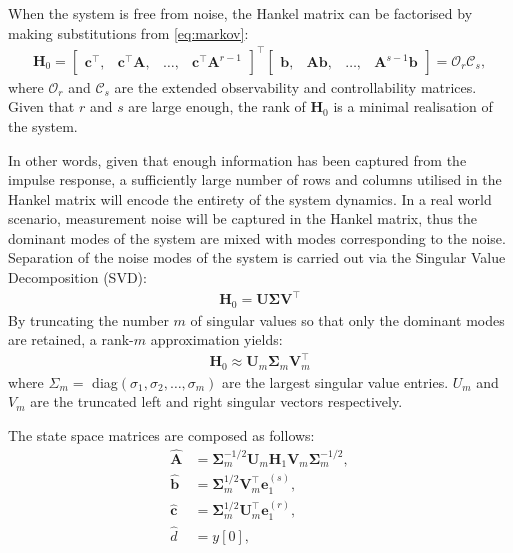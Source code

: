 When the system is free from noise, the Hankel matrix can be factorised by making substitutions from \eqref{eq:markov}:
\begin{align}
\label{eq:factorised}
    \mathbf{H}_0 = 
    \begin{bmatrix}
    \mathbf{c}^{\top}, & \mathbf{c}^{\top} \mathbf{A}, & \dots, & \mathbf{c}^{\top} \mathbf{A}^{r-1}
    \end{bmatrix}^{\top}
    \begin{bmatrix}
    \mathbf{b}, & \mathbf{A} \mathbf{b}, & \dots, & \mathbf{A}^{s-1} \mathbf{b}
    \end{bmatrix}
    = \mathcal{O}_r \mathcal{C}_s,
\end{align}
where $\mathcal{O}_r$ and $\mathcal{C}_s$ are the extended observability and controllability matrices. Given that $r$ and $s$ are large enough, the rank of $\mathbf{H}_0$ is a minimal realisation of the system.

In other words, given that enough information has been captured from the impulse response, a sufficiently large number of rows and columns utilised in the Hankel matrix will encode the entirety of the system dynamics. In a real world scenario, measurement noise will be captured in the Hankel matrix, thus the dominant modes of the system are mixed with modes corresponding to the noise. Separation of the noise modes of the system is carried out via the Singular Value Decomposition (SVD):
\begin{align}
\label{eq:svd}
    \mathbf{H}_0 = \mathbf{U \Sigma V}^\top
\end{align}
By truncating the number $m$ of singular values so that only the dominant modes are retained, a rank-$m$ approximation yields:
\begin{align}
\label{eq:svdm}
    \mathbf{H}_0 \approx \mathbf{U}_m \mathbf{\Sigma}_m \mathbf{V}_{m}^{\top}
\end{align}
where $\Sigma_m =$ diag$(\sigma_1,\sigma_2, \dots, \sigma_m)$ are the largest singular value entries. $U_m$ and $V_m$ are the truncated left and right singular vectors respectively.

The state space matrices are composed as follows:
\begin{align}
\label{eq:ss}
\hat{\mathbf{A}} &= \mathbf{\Sigma}_{m}^{-1/2} \mathbf{U}_m \mathbf{H}_1 \mathbf{V}_m \mathbf{\Sigma}_{m}^{-1/2}, \\
\hat{\mathbf{b}} &= \mathbf{\Sigma}_{m}^{1/2} \mathbf{V}_m^{\top} \mathbf{e}_{1}^{(s)}, \\
\hat{\mathbf{c}} &= \mathbf{\Sigma}_{m}^{1/2} \mathbf{U}_{m}^{\top} \mathbf{e}_{1}^{(r)}, \\
\hat{d} &= y[0],
\end{align}

